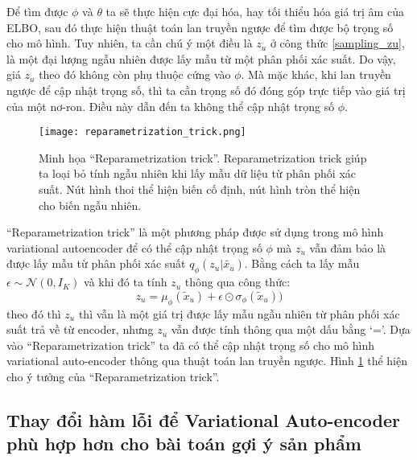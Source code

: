     Để tìm được $\phi$ và $\theta$ ta sẽ thực hiện cực đại hóa, hay tối thiểu hóa giá trị âm của ELBO, sau đó thực hiện thuật toán lan truyền ngược để tìm được bộ trọng số cho mô hình. 
    Tuy nhiên, ta cần chú ý một điều là $z_u$ ở công thức \ref{sampling_zu}, là một đại lượng ngẫu nhiên được lấy mẫu từ một phân phối xác suất.
    Do vậy, giá $z_u$ theo đó không còn phụ thuộc cứng vào $\phi$.
    Mà mặc khác, khi lan truyền ngược để cập nhật trọng số, thì ta cần trọng số đó đóng góp trực tiếp vào giá trị của một nơ-ron.
    Điều này dẫn đến ta không thể cập nhật trọng số $\phi$. 
    \begin{figure}
        \centering
        \texttt{[image: reparametrization\_trick.png]}
        \caption{Minh họa ``Reparametrization trick''. Reparametrization trick giúp ta loại bỏ tính ngẫu nhiên khi lấy mẫu dữ liệu từ phân phối xác suất. Nút hình thoi thể hiện biến cố định, nút hình tròn thể hiện cho biến ngẫu nhiên.}
        \label{fig_repatrick}
    \end{figure}
    ``Reparametrization trick'' là một phương pháp được sử dụng trong mô hình variational autoencoder để có thể cập nhật trọng số $\phi$ mà $z_u$ vẫn đảm bảo là được lấy mẫu từ phân phối xác suất $q_\phi(z_u|\tilde{x_u})$. 
    Bằng cách ta lấy mẫu $\epsilon \sim \mathcal{N}(0,I_K)$ và khi đó ta tính $z_u$ thông qua công thức:
    \begin{equation}
        z_u = \mu_\phi(\tilde{x}_u) + \epsilon \odot \sigma_\phi(\tilde{x}_u))
    \end{equation}
    theo đó thì $z_u$ thì vẫn là một giá trị được lấy mẫu ngẫu nhiên từ phân phối xác suất trả về từ encoder, nhưng $z_u$ vẫn được tính thông qua một dấu bằng `='.
    Dựa vào ``Reparametrization trick'' ta đã có thể cập nhật trọng số cho mô hình variational auto-encoder thông qua thuật toán lan truyền ngược. 
    Hình \ref{fig_repatrick} thể hiện cho ý tưởng của ``Reparametrization trick''.

    \subsection{Thay đổi hàm lỗi để Variational Auto-encoder phù hợp hơn cho bài toán gợi ý sản phẩm}


